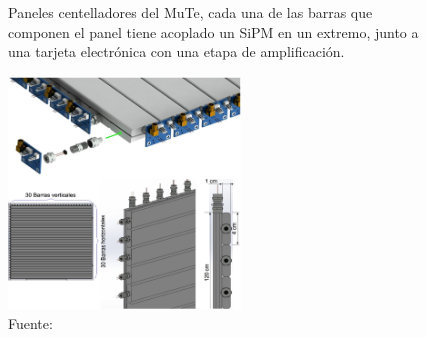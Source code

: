\begin{figure}[h!]
\begin{centering}
  \caption{Paneles centelladores del MuTe, cada una de las barras que componen el panel tiene acoplado un SiPM en un extremo, junto a una tarjeta electrónica con una etapa de amplificación.}
  \includegraphics[width=0.55\textwidth]{Images/Panel.eps}
  \caption*{Fuente:}%
  \label{fig:Hodoscopio}
  \par\end{centering}
\end{figure}